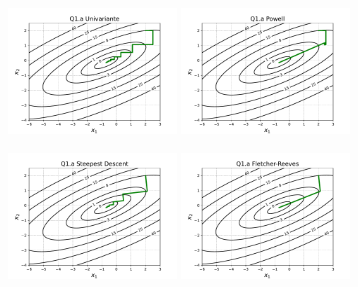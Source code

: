 \documentclass[10pt, a4paper]{article}
\begin{document}
\begin{figure}[H]
  \centering
  \begin{subfigure}[b]{\textwidth}
    \includegraphics[width=0.49\textwidth]{figuras/Q1.a_Univariante_P0=[2 2].pdf}
    \includegraphics[width=0.49\textwidth]{figuras/Q1.a_Powell_P0=[2 2].pdf}
  \end{subfigure}
  \begin{subfigure}[b]{\textwidth}
    \includegraphics[width=0.49\textwidth]{figuras/Q1.a_Steepest Descent_P0=[2 2].pdf}
    \includegraphics[width=0.49\textwidth]{figuras/Q1.a_Fletcher-Reeves_P0=[2 2].pdf}

\end{subfigure}
\end{figure}
\end{document}

